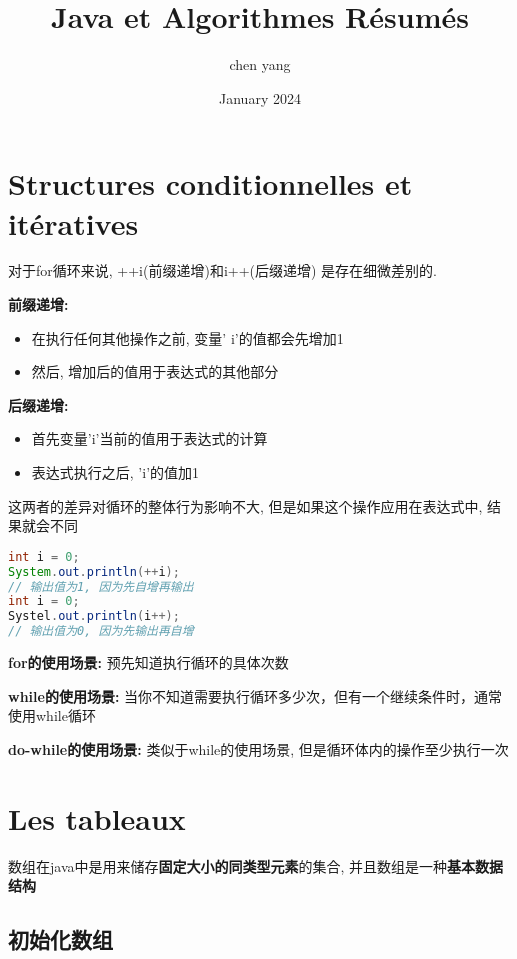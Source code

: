 \documentclass{article}
\title{Java et Algorithmes Résumés}
\author{chen yang}
\date{January 2024}
\begin{document}
\maketitle
\tableofcontents
\newpage
\section{Structures conditionnelles et itératives}

对于for循环来说, ++i(前缀递增)和i++(后缀递增) 是存在细微差别的. 

\textbf{前缀递增:}
\begin{itemize}
    \item 在执行任何其他操作之前, 变量' i'的值都会先增加1
    \item 然后, 增加后的值用于表达式的其他部分
\end{itemize}

\textbf{后缀递增:}
\begin{itemize}
    \item 首先变量'i'当前的值用于表达式的计算
    \item 表达式执行之后, 'i'的值加1
\end{itemize}

这两者的差异对循环的整体行为影响不大, 但是如果这个操作应用在表达式中, 结果就会不同
\begin{tcolorbox}[colframe=black,colback=gray!10]
\begin{lstlisting}[language=java]
int i = 0;
System.out.println(++i);
// 输出值为1, 因为先自增再输出
int i = 0;
Systel.out.println(i++);
// 输出值为0, 因为先输出再自增
\end{lstlisting}
\end{tcolorbox}
\textbf{for的使用场景: }预先知道执行循环的具体次数

\textbf{while的使用场景: }当你不知道需要执行循环多少次，但有一个继续条件时，通常使用while循环

\textbf{do-while的使用场景: }类似于while的使用场景, 但是循环体内的操作至少执行一次

\section{Les tableaux}

数组在java中是用来储存\textbf{固定大小的同类型元素}的集合, 并且数组是一种\textbf{基本数据结构}

\subsection{ 初始化数组}
\end{document}
